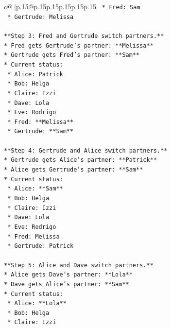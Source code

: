 \documentclass{article}
\begin{document}
{\begin{supertabular}{c@{$\;$}|p{.15\linewidth}@{}p{.15\linewidth}p{.15\linewidth}p{.15\linewidth}p{.15\linewidth}p{.15\linewidth}}
{{{\texttt{    *   Fred: Sam} \\
\texttt{    *   Gertrude: Melissa} \\
\\ 
\texttt{**Step 3: Fred and Gertrude switch partners.**} \\
\texttt{*   Fred gets Gertrude's partner: **Melissa**} \\
\texttt{*   Gertrude gets Fred's partner: **Sam**} \\
\texttt{*   Current status:} \\
\texttt{    *   Alice: Patrick} \\
\texttt{    *   Bob: Helga} \\
\texttt{    *   Claire: Izzi} \\
\texttt{    *   Dave: Lola} \\
\texttt{    *   Eve: Rodrigo} \\
\texttt{    *   Fred: **Melissa**} \\
\texttt{    *   Gertrude: **Sam**} \\
\\ 
\texttt{**Step 4: Gertrude and Alice switch partners.**} \\
\texttt{*   Gertrude gets Alice's partner: **Patrick**} \\
\texttt{*   Alice gets Gertrude's partner: **Sam**} \\
\texttt{*   Current status:} \\
\texttt{    *   Alice: **Sam**} \\
\texttt{    *   Bob: Helga} \\
\texttt{    *   Claire: Izzi} \\
\texttt{    *   Dave: Lola} \\
\texttt{    *   Eve: Rodrigo} \\
\texttt{    *   Fred: Melissa} \\
\texttt{    *   Gertrude: Patrick} \\
\\ 
\texttt{**Step 5: Alice and Dave switch partners.**} \\
\texttt{*   Alice gets Dave's partner: **Lola**} \\
\texttt{*   Dave gets Alice's partner: **Sam**} \\
\texttt{*   Current status:} \\
\texttt{    *   Alice: **Lola**} \\
\texttt{    *   Bob: Helga} \\
\texttt{    *   Claire: Izzi} \\
}}}
\end{supertabular}}
\end{document}
